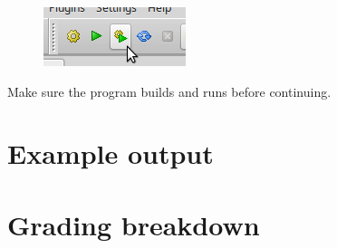             \begin{figure}[h]
                \centering
                \includegraphics{images-2018-01/codeblocks_buildrun.png}
            \end{figure}

            Make sure the program builds and runs before continuing.
                
    \newpage

    \section{Example output}

    \section{Grading breakdown}


